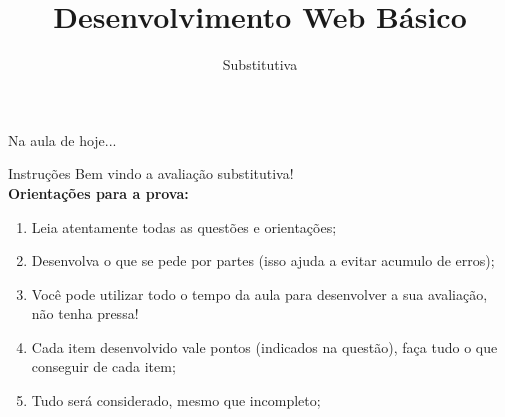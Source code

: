 \documentclass{beamer}
\title{Desenvolvimento Web Básico}
\subtitle{Substitutiva}
\begin{document}
\frame{
 \titlepage
}

\begin{frame}{Na aula de hoje...} 
\tableofcontents 
\end{frame}
\begin{frame}{Instruções}
Bem vindo a avaliação substitutiva! \\
\textbf{Orientações para a prova:}

  \begin{enumerate}
      \item Leia atentamente todas as questões e orientações;
      \item Desenvolva o que se pede por partes (isso ajuda a evitar acumulo de erros);
     \item Você pode utilizar todo o tempo da aula para desenvolver a sua avaliação, não tenha pressa!
     \item Cada item desenvolvido vale pontos (indicados na questão), faça tudo o que conseguir de cada item;
     \item Tudo será considerado, mesmo que incompleto; 
  \end{enumerate}
\end{frame}
\end{document}

